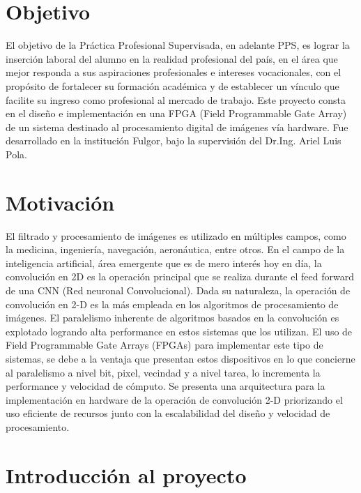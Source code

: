 \documentclass[]{IEEEphot}
\begin{document}
\vspace{40pt}
\section*{Objetivo} \label{objetivo_sec}
El objetivo de la Práctica Profesional Supervisada, en adelante PPS, es lograr la inserción laboral del alumno en la realidad profesional del país, en el área que mejor responda a sus aspiraciones profesionales e intereses vocacionales, con el propósito de fortalecer su formación académica y de establecer un vínculo que facilite su ingreso como profesional al mercado de trabajo. 
Este proyecto consta en el diseño e implementación en una FPGA (Field Programmable Gate Array) de un sistema destinado al procesamiento digital de imágenes vía hardware. 
Fue desarrollado en la institución Fulgor, bajo la supervisión del Dr.Ing. Ariel Luis Pola.

\section*{Motivación}  \label{motiv_sec}
El filtrado y procesamiento de imágenes es utilizado en múltiples campos, como la medicina, ingeniería, navegación, aeronáutica, entre otros. En el campo de la inteligencia artificial, área emergente que es de mero interés hoy en día, la convolución en 2D es la operación principal que se realiza durante el feed forward de una CNN (Red neuronal Convolucional). 
Dada su naturaleza, la operación de convolución en 2-D es la más empleada en los algoritmos de procesamiento de imágenes. El paralelismo inherente de algoritmos basados en la convolución es explotado logrando alta performance en estos sistemas que los utilizan.
El uso de Field Programmable Gate Arrays (FPGAs) para implementar este tipo de sistemas, se debe a la ventaja que presentan estos dispositivos en lo que concierne al paralelismo a nivel bit, pixel, vecindad y a nivel tarea, lo incrementa la performance y velocidad de cómputo.
Se presenta una arquitectura para la implementación en hardware de la operación de convolución 2-D priorizando el uso eficiente de recursos junto con la escalabilidad del diseño y velocidad de procesamiento.

\newpage

\section{Introducción al proyecto} \label{intro_secc}
\end{document}
